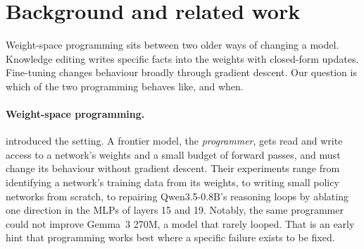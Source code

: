 \section{Background and related work}

Weight-space programming sits between two older ways of changing a model. Knowledge editing writes specific facts into the weights with closed-form updates. Fine-tuning changes behaviour broadly through gradient descent. Our question is which of the two programming behaves like, and when.

\paragraph{Weight-space programming.} \citet{takehi2026sparks} introduced the setting. A frontier model, the \emph{programmer}, gets read and write access to a network's weights and a small budget of forward passes, and must change its behaviour without gradient descent. Their experiments range from identifying a network's training data from its weights, to writing small policy networks from scratch, to repairing Qwen3.5-0.8B's reasoning loops by ablating one direction in the MLPs of layers 15 and 19. Notably, the same programmer could not improve Gemma~3 270M, a model that rarely looped. That is an early hint that programming works best where a specific failure exists to be fixed.

